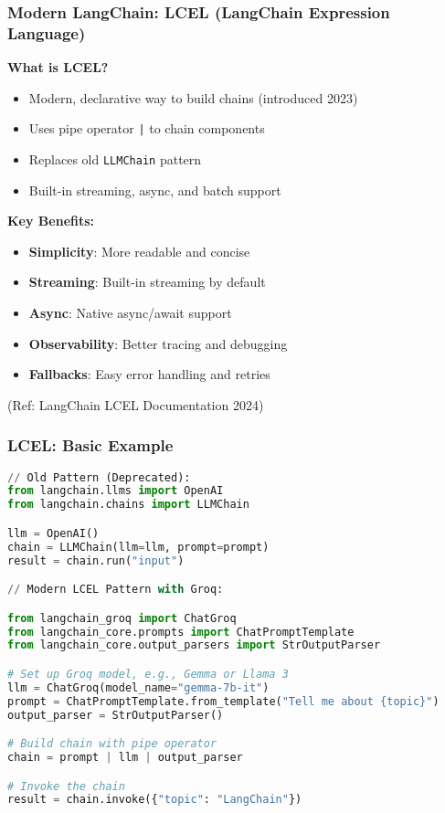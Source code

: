 \begin{frame}[fragile]\frametitle{Modern LangChain: LCEL (LangChain Expression Language)}

\textbf{What is LCEL?}
\begin{itemize}
\item Modern, declarative way to build chains (introduced 2023)
\item Uses pipe operator \texttt{|} to chain components
\item Replaces old \texttt{LLMChain} pattern
\item Built-in streaming, async, and batch support
\end{itemize}

\textbf{Key Benefits:}
\begin{itemize}
\item \textbf{Simplicity}: More readable and concise
\item \textbf{Streaming}: Built-in streaming by default
\item \textbf{Async}: Native async/await support
\item \textbf{Observability}: Better tracing and debugging
\item \textbf{Fallbacks}: Easy error handling and retries
\end{itemize}

{\tiny (Ref: LangChain LCEL Documentation 2024)}
\end{frame}

\begin{frame}[fragile]\frametitle{LCEL: Basic Example}


\begin{lstlisting}[language=python, basicstyle=\tiny]
// Old Pattern (Deprecated):
from langchain.llms import OpenAI
from langchain.chains import LLMChain

llm = OpenAI()
chain = LLMChain(llm=llm, prompt=prompt)
result = chain.run("input")

// Modern LCEL Pattern with Groq:

from langchain_groq import ChatGroq
from langchain_core.prompts import ChatPromptTemplate
from langchain_core.output_parsers import StrOutputParser

# Set up Groq model, e.g., Gemma or Llama 3
llm = ChatGroq(model_name="gemma-7b-it")
prompt = ChatPromptTemplate.from_template("Tell me about {topic}")
output_parser = StrOutputParser()

# Build chain with pipe operator
chain = prompt | llm | output_parser

# Invoke the chain
result = chain.invoke({"topic": "LangChain"})
\end{lstlisting}

\end{frame}

